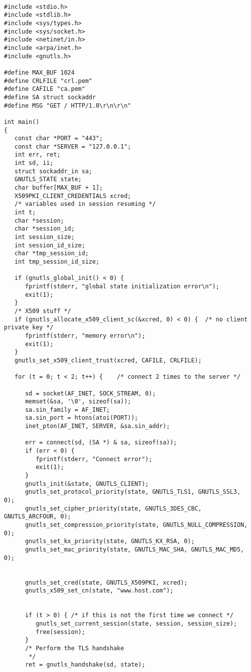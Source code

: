 \begin{verbatim}

#include <stdio.h>
#include <stdlib.h>
#include <sys/types.h>
#include <sys/socket.h>
#include <netinet/in.h>
#include <arpa/inet.h>
#include <gnutls.h>

#define MAX_BUF 1024
#define CRLFILE "crl.pem"
#define CAFILE "ca.pem"
#define SA struct sockaddr
#define MSG "GET / HTTP/1.0\r\n\r\n"

int main()
{
   const char *PORT = "443";
   const char *SERVER = "127.0.0.1";
   int err, ret;
   int sd, ii;
   struct sockaddr_in sa;
   GNUTLS_STATE state;
   char buffer[MAX_BUF + 1];
   X509PKI_CLIENT_CREDENTIALS xcred;
   /* variables used in session resuming */
   int t;
   char *session;
   char *session_id;
   int session_size;
   int session_id_size;
   char *tmp_session_id;
   int tmp_session_id_size;

   if (gnutls_global_init() < 0) {
      fprintf(stderr, "global state initialization error\n");
      exit(1);
   }
   /* X509 stuff */
   if (gnutls_allocate_x509_client_sc(&xcred, 0) < 0) {  /* no client private key */
      fprintf(stderr, "memory error\n");
      exit(1);
   }
   gnutls_set_x509_client_trust(xcred, CAFILE, CRLFILE);

   for (t = 0; t < 2; t++) {    /* connect 2 times to the server */

      sd = socket(AF_INET, SOCK_STREAM, 0);
      memset(&sa, '\0', sizeof(sa));
      sa.sin_family = AF_INET;
      sa.sin_port = htons(atoi(PORT));
      inet_pton(AF_INET, SERVER, &sa.sin_addr);

      err = connect(sd, (SA *) & sa, sizeof(sa));
      if (err < 0) {
         fprintf(stderr, "Connect error");
         exit(1);
      }
      gnutls_init(&state, GNUTLS_CLIENT);
      gnutls_set_protocol_priority(state, GNUTLS_TLS1, GNUTLS_SSL3, 0);
      gnutls_set_cipher_priority(state, GNUTLS_3DES_CBC, GNUTLS_ARCFOUR, 0);
      gnutls_set_compression_priority(state, GNUTLS_NULL_COMPRESSION, 0);
      gnutls_set_kx_priority(state, GNUTLS_KX_RSA, 0);
      gnutls_set_mac_priority(state, GNUTLS_MAC_SHA, GNUTLS_MAC_MD5, 0);


      gnutls_set_cred(state, GNUTLS_X509PKI, xcred);
      gnutls_x509_set_cn(state, "www.host.com");


      if (t > 0) { /* if this is not the first time we connect */
         gnutls_set_current_session(state, session, session_size);
         free(session);
      }
      /* Perform the TLS handshake
       */
      ret = gnutls_handshake(sd, state);


\end{verbatim}
